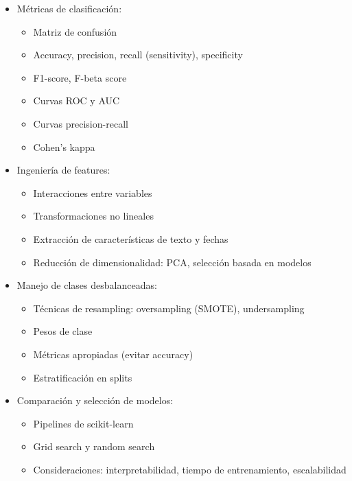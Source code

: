 \documentclass[a4paper,11pt]{article}
\begin{document}
\begin{itemize}[leftmargin=*]
\begin{itemize}
        \item Selección de k
        \item Distancias: euclidiana, Manhattan, Minkowski
        \item Limitaciones: escalabilidad, curse of dimensionality
    \end{itemize}
    \item Métricas de clasificación:
    \begin{itemize}
        \item Matriz de confusión
        \item Accuracy, precision, recall (sensitivity), specificity
        \item F1-score, F-beta score
        \item Curvas ROC y AUC
        \item Curvas precision-recall
        \item Cohen's kappa
    \end{itemize}
    \item Ingeniería de features:
    \begin{itemize}
        \item Interacciones entre variables
        \item Transformaciones no lineales
        \item Extracción de características de texto y fechas
        \item Reducción de dimensionalidad: PCA, selección basada en modelos
    \end{itemize}
    \item Manejo de clases desbalanceadas:
    \begin{itemize}
        \item Técnicas de resampling: oversampling (SMOTE), undersampling
        \item Pesos de clase
        \item Métricas apropiadas (evitar accuracy)
        \item Estratificación en splits
    \end{itemize}
    \item Comparación y selección de modelos:
    \begin{itemize}
        \item Pipelines de scikit-learn
        \item Grid search y random search
        \item Consideraciones: interpretabilidad, tiempo de entrenamiento, escalabilidad
    \end{itemize}
\end{itemize}
\end{document}
